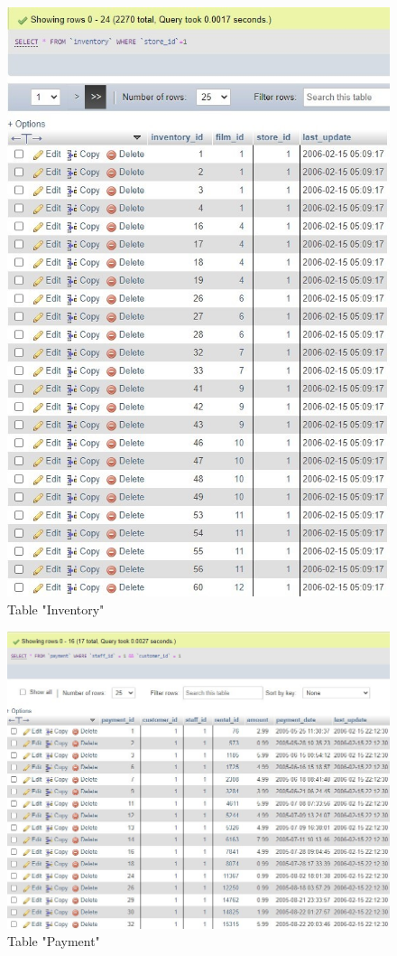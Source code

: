 \documentclass{article}
\begin{document}
		\begin{figure}[H]
			\includegraphics[width=\textwidth]{inventory_selectwhere}
			\caption{Table "Inventory"}
		\end{figure}
		\begin{figure}[H]
			\includegraphics[width=\textwidth]{payment_selectwhere}
			\caption{Table "Payment"}
		\end{figure}
\end{document}

